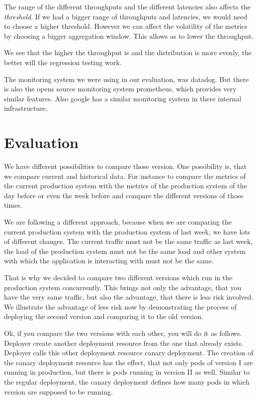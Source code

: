 The range of the different throughputs and the different latencies also affects the
\emph{threshold}. If we had a bigger range of throughputs and latencies, we would need to
choose a higher threshold. However we can affect the volatility of the metrics by choosing
a bigger aggregation window. This allows as to lower the throughput.

We see that the higher the throughput is and the distribution is more evenly, the better
will the regression testing work.

The monitoring system we were using in our evaluation, was datadog. But there is also the
opens source monitoring system prometheus, which provides very similar features. Also
google has a similar monitoring system in there internal infrastructure.

\chapter{Evaluation}

We have different possibilities to compare those version. One possibility is, that we
compare current and historical data. For instance to compare the metrics of the current
production system with the metrics of the production system of the day before or even the
week before and compare the different versions of those times.

We are following a different approach, because when we are comparing the current
production system with the production system of last week, we have lots of different
changes. The current traffic must not be the same traffic as last week, the load of the
production system must not be the same load and other system with which the application is
interacting with must not be the same.

That is why we decided to compare two different versions which run in the production
system concurrently. This brings not only the advantage, that you have the very same
traffic, but also the advantage, that there is less risk involved. We illustrate the
advantage of less risk now by demonstrating the process of deploying the second version
and comparing it to the old version.

Ok, if you compare the two versions with each other, you will do it as follows. Deployer
create another deployment resource from the one that already exists. Deployer calls this
other deployment resource canary deployment. The creation of the canary deployment
resource has the effect, that not only pods of version I are running in production, but
there is pods running in version II as well. Similar to the regular deployment, the canary
deployment defines how many pods in which version are supposed to be running.

